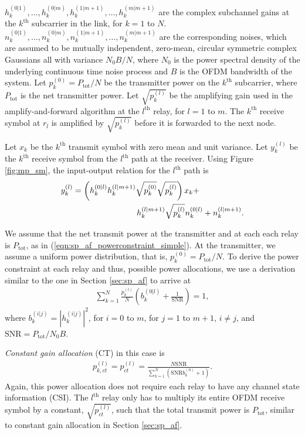 \documentclass[conference]{IEEEtran}
\begin{document}
$h_k^{(0|1)}, \ldots, h_k^{(0|m)}, h_k^{(1|m+1)}, \ldots, h_k^{(m|m+1)}$ are the complex subchannel gains at the $k^{\mbox{th}}$ subcarrier in the link, for $k = 1$ to $N$.   $n_k^{(0|1)}, \ldots, n_k^{(0|m)}, n_k^{(1|m+1)}, \ldots, n_k^{(m|m+1)}$ are the corresponding noises, which are assumed to be mutually independent, zero-mean, circular symmetric complex Gaussians all with variance $N_0 B / N$, where $N_0$ is the power spectral density of the underlying continuous time noise process and $B$ is the OFDM bandwidth of the system.  Let $p_k^{(0)} = P_{\mbox{tot}}/N$ be the transmitter power on the $k^{\mbox{th}}$ subcarrier, where $P_{\mbox{tot}}$ is the net transmitter power.  Let  $\sqrt{p_k^{(l)}}$ be the amplifying gain used in the amplify-and-forward algorithm at the $l^{\mbox{th}}$ relay, for $l=1$ to $m$.  The $k^{\mbox{th}}$ receive symbol at $r_l$ is amplified by $\sqrt{p_k^{(l)}}$ before it is forwarded to the next node.

Let $x_k$ be the $k^{\mbox{th}}$ transmit symbol with zero mean and unit variance.  Let $y_k^{(l)}$  be the $k^{\mbox{th}}$ receive symbol from the $l^{\mbox{th}}$ path at the receiver.  Using Figure \ref{fig:mp_sm}, the input-output relation for the $l^{\mbox{th}}$ path is
\begin{eqnarray}
y_k^{(l)} = \left( h_k^{(0|l)} h_k^{(l|m+1)} \sqrt{p_k^{(0)}} \sqrt{p_k^{(l)}} \right) x_k
+ \hspace{.75in} \nonumber \\
\hspace{.75in} h_k^{(l|m+1)} \sqrt{p_k^{(l)}}  n_k^{(0|l)} +
n_k^{(l|m+1)}. \label{eqn:mp_af_inout}
\end{eqnarray}

We assume that the net transmit power at the transmitter and at
each each relay is $P_{\mbox{tot}}$, as in
(\ref{eqn:sp_af_powerconstraint_simple}).  At the transmitter, we
assume a uniform power distribution, that is, $p_k^{(0)} =
P_{\mbox{tot}}/N$.  To derive the power constraint at each relay
and thus, possible power allocations, we use a derivation similar
to the one in Section \ref{sec:sp_af} to arrive at
\begin{eqnarray}
\sum_{k=1}^N \frac{ p_k^{(l)}}{N} \left(
b_k^{(0|l)} +
\frac{1}{\mbox{SNR}} \right) =1,
\label{eqn:mp_af_powerconstraint}
\end{eqnarray}
where $b_k^{(i|j)} = \left| h_k^{(i|j)} \right|^2$, for $i=0$ to $m$, for $j=1$ to $m+1$, $i \neq j$, and $\mbox{SNR} = P_{\mbox{tot}} / N_0 B$.

\emph{Constant gain allocation} (CT) in this case is
\begin{eqnarray}
p_{k,ct}^{(l)} = p_{ct}^{(l)} =
 \frac{N \mbox{SNR}}
{\displaystyle \sum_{k=1}^N \left( \mbox{SNR} b_k^{(0)} + 1 \right)
} \mbox{.}
\end{eqnarray}
Again, this power allocation does not require each relay to have
any channel state information (CSI).  The $l^{\mbox{th}}$ relay
only has to multiply its entire OFDM receive symbol by a constant,
$\sqrt{p_{ct}^{(l)}}$, such that the total transmit power is
$P_{\mbox{tot}}$, similar to constant gain allocation in Section
\ref{sec:sp_af}.
\end{document}
